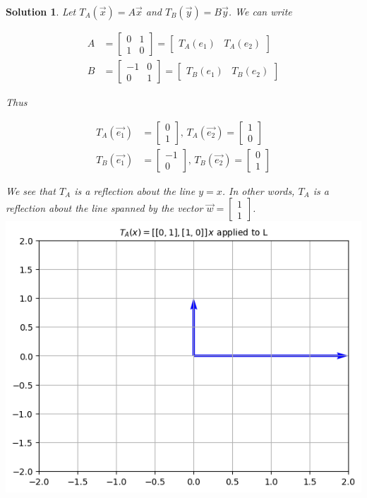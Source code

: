 \documentclass{article}
\newtheorem*{solution}{Solution}
\begin{document}
\begin{solution}
Let $T_{A}(\vec{x}) = A\vec{x}$ and $T_{B}(\vec{y}) = B\vec{y}$. We can write 

\begin{align*}
A &= \begin{bmatrix}0 & 1 \\ 1 & 0 \end{bmatrix} = \begin{bmatrix} T_{A} (e_{1}) & T_{A} (e_{2}) \end{bmatrix} \\
B &= \begin{bmatrix}-1 & 0 \\ 0 & 1 \end{bmatrix} = \begin{bmatrix} T_{B} (e_{1}) & T_{B} (e_{2}) \end{bmatrix}
\end{align*}

Thus 

\begin{align*}
T_{A}(\vec{e_{1}}) &= \begin{bmatrix} 0 \\ 1 \end{bmatrix}, \,T_{A}(\vec{e_{2}}) = \begin{bmatrix} 1 \\ 0 \end{bmatrix} \\
T_{B}(\vec{e_{1}}) &= \begin{bmatrix} -1 \\ 0 \end{bmatrix}, \, T_{B}(\vec{e_{2}}) = \begin{bmatrix} 0 \\ 1 \end{bmatrix}
\end{align*}

We see that $T_{A}$ is a reflection about the line $y = x$. In other words, $T_{A}$ is a reflection about the line spanned by the vector $\vec{w} = \begin{bmatrix} 1 \\ 1 \end{bmatrix}$. \\

\includegraphics[scale=0.5, center]{Lreflectyeqx} 


\end{solution}
\end{document}
